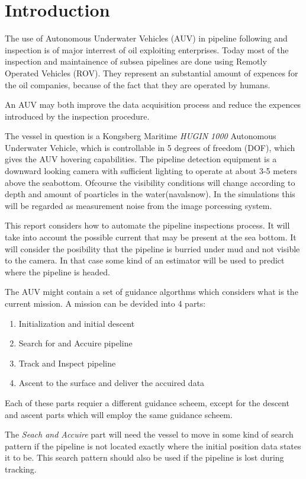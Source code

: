 \chapter{Introduction}

	The use of Autonomous Underwater Vehicles (AUV) in pipeline following and inspection is of major
	interrest of oil exploiting enterprises. Today most of the inspection and maintainence of subsea
	pipelines are done using Remotly Operated Vehicles (ROV). They represent an substantial amount of
	expences for the oil companies, because of the fact that they are operated by humans. 
	
	An AUV may both improve the data acquisition process and reduce the expences introduced by the
	inspection procedure. 
	
	The vessel in question is a Kongsberg Maritime \textit{HUGIN 1000} Autonomous Underwater Vehicle,
	which is controllable in 5 degrees of freedom (DOF), which gives the AUV hovering capabilities. The
	pipeline detection equipment is a downward looking camera with sufficient lighting to operate at about
	3-5 meters above the seabottom. Ofcourse the visibility conditions will change according to depth and
	amount of poarticles in the water(navalsnow). In the simulations this will be regarded as measurement
	noise from the image porcessing system. 
	
	
	This report considers how to automate the pipeline inspections process. It will take into account the
	possible current that may be present at the sea bottom. It will consider the posibility that the
	pipeline is burried under mud and not visible to the camera. In that case some kind of an estimator
	will be used to predict where the pipeline is headed.
	
	The AUV might contain a set of guidance algorthms which considers what is the current mission. A 
	mission can be devided into 4 parts:
	\begin{enumerate}
	 \item Initialization and initial descent
	 \item Search for and Accuire pipeline
	 \item Track and Inspect pipeline
	 \item Ascent to the surface and deliver the accuired data
	\end{enumerate}
	Each of these parts requier a different guidance scheem, except for the descent and ascent parts
	which will employ the same guidance scheem. 
	
	The \textit{Seach and Accuire} part will need the vessel to move in some kind of search pattern if
	the pipeline is not located exactly where the initial position data states it to be. This search
	pattern should also be used if the pipeline is lost during tracking. 
	
